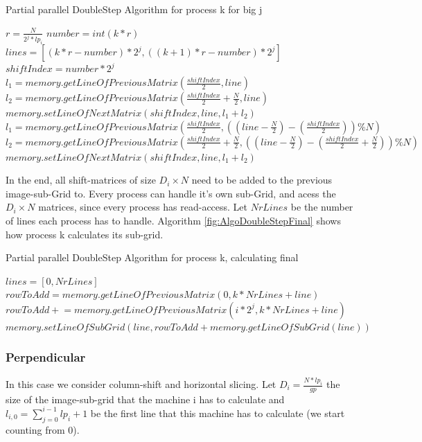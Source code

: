 \documentclass[12pt]{article}
\begin{document}
\begin{algorithm}
\caption{Partial parallel DoubleStep Algorithm for process k for big j}\label{euclid}
\label{fig:AlgoDoubleStepParaBig}
\begin{algorithmic}[1]
\State $r = \frac{N}{2^j*lp_i}$
\State $number = int(k*r)$
\State $lines = [(k*r-number)*2^j,((k+1)*r-number)*2^j]$
\State $shiftIndex =number*2^j$
          \State $l_1 = memory.getLineOfPreviousMatrix( \frac{shiftIndex}{2}, line )$
          \State $l_2 = memory.getLineOfPreviousMatrix( \frac{shiftIndex}{2}+\frac{N}{2},line )$
          \State $memory.setLineOfNextMatrix(shiftIndex, line, l_1+l_2)$
      \Else
          \State $l_1 = memory.getLineOfPreviousMatrix( \frac{shiftIndex}{2}, ((line-\frac{N}{2})-(\frac{shiftIndex}{2}))\%N )$
          \State $l_2 = memory.getLineOfPreviousMatrix( \frac{shiftIndex}{2}+\frac{N}{2},((line-\frac{N}{2})-(\frac{shiftIndex}{2}+\frac{N}{2}))\%N)$
          \State $memory.setLineOfNextMatrix(shiftIndex, line, l_1+l_2)$      
      \EndIf
\EndFor
\end{algorithmic}
\end{algorithm}

In the end, all shift-matrices of size $D_i \times N$ need to be added to the previous image-sub-Grid to. Every process can handle it's own sub-Grid, and acess the $D_i \times N$ matrices, since every process has read-access. Let $NrLines$ be the number of lines each process has to handle. Algorithm \ref{fig:AlgoDoubleStepFinal} shows how process k calculates its sub-grid.

\begin{algorithm}
\caption{Partial parallel DoubleStep Algorithm for process k, calculating final}\label{euclid}
\label{fig:AlgoDoubleStepFinal}
\begin{algorithmic}[1]
\State $lines = [0 ,NrLines]$
      \State $rowToAdd = memory.getLineOfPreviousMatrix(0, k*NrLines+line)$
             \State $rowToAdd \mathrel{+}= memory.getLineOfPreviousMatrix(i*2^j, k*NrLines+line)$
      \EndFor
      \State $memory.setLineOfSubGrid(line, rowToAdd + memory.getLineOfSubGrid(line) )$
\EndFor
\end{algorithmic}
\end{algorithm}

\subsubsection{ Perpendicular }
In this case we consider column-shift and horizontal slicing.  Let $D_i=\frac{N*lp_i}{gp}$ the size of the image-sub-grid that the machine i has to calculate and $l_{i,0}=\sum_{j=0}^{i-1}lp_i+1$ be the first line that this machine has to calculate (we start counting from 0).\\
\end{document}
